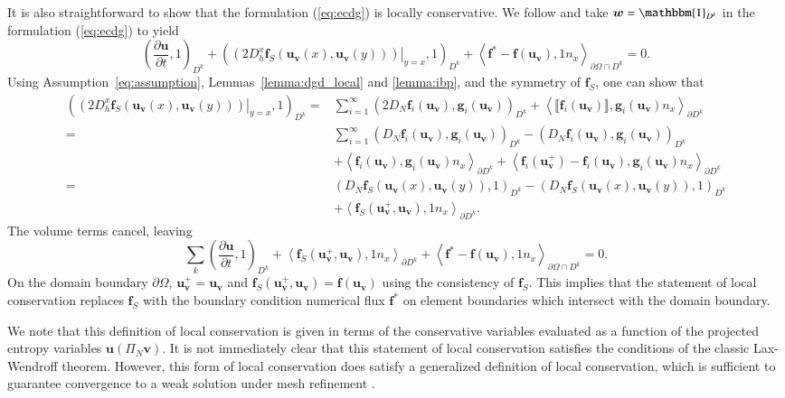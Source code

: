 \documentclass[preprint,10pt]{elsarticle}
\theoremstyle{definition}
\theoremstyle{lemma}
\theoremstyle{theorem}
\theoremstyle{assumption}
\newcommand{\pd}[2]{\frac{\partial#1}{\partial#2}}
\newcommand{\LRp}[1]{\left( #1 \right)}
\newcommand{\LRa}[1]{\left\langle #1 \right\rangle}
\newcommand{\jump}[1] {\ensuremath{\llbracket#1\rrbracket}}
\begin{document}
It is also straightforward to show that the formulation (\ref{eq:ecdg}) is locally conservative.  We follow \cite{chen2017entropy} and take $\bm{w} = \mathbbm{1}_{D^k}$ in the formulation (\ref{eq:ecdg}) to yield
\[
\LRp{\pd{\bm{u}}{t},1}_{D^k} + \LRp{\left.\LRp{2D^x_h\bm{f}_S(\bm{u}_{\bm{v}}(x),\bm{u}_{\bm{v}}(y))}\right|_{y=x},1}_{D^k} + \LRa{\bm{f}^*-\bm{f}(\bm{u}_{\bm{v}}),1{n}_x}_{\partial \Omega \cap D^k} = 0.  
\]
Using Assumption~\ref{eq:assumption}, Lemmas~\ref{lemma:dgd_local} and \ref{lemma:ibp}, and the symmetry of $\bm{f}_S$, one can show that
\begin{align*}
\LRp{\left.\LRp{2D^x_h\bm{f}_S(\bm{u}_{\bm{v}}(x),\bm{u}_{\bm{v}}(y))}\right|_{y=x},1}_{D^k} =& \sum_{i=1}^{\infty} \LRp{2D_N \bm{f}_i(\bm{u}_{\bm{v}}),\bm{g}_i(\bm{u}_{\bm{v}})}_{D^k} + \LRa{\jump{\bm{f}_i(\bm{u}_{\bm{v}})},\bm{g}_i(\bm{u}_{\bm{v}}){n}_x}_{\partial D^k}\\
=& \sum_{i=1}^{\infty} \LRp{D_N \bm{f}_i(\bm{u}_{\bm{v}}),\bm{g}_i(\bm{u}_{\bm{v}})}_{D^k} - \LRp{D_N \bm{f}_i(\bm{u}_{\bm{v}}),\bm{g}_i(\bm{u}_{\bm{v}})}_{D^k} \\
&+ \LRa{\bm{f}_i(\bm{u}_{\bm{v}}),\bm{g}_i(\bm{u}_{\bm{v}}){n}_x}_{\partial D^k} + \LRa{\bm{f}_i(\bm{u}_{\bm{v}}^+)-\bm{f}_i(\bm{u}_{\bm{v}}),\bm{g}_i(\bm{u}_{\bm{v}}){n}_x}_{\partial D^k}\\
=& \LRp{D_N \bm{f}_S(\bm{u}_{\bm{v}}(x),\bm{u}_{\bm{v}}(y)),1}_{D^k} -  \LRp{D_N \bm{f}_S(\bm{u}_{\bm{v}}(x),\bm{u}_{\bm{v}}(y)),1}_{D^k}\\
&+ \LRa{\bm{f}_S(\bm{u}_{\bm{v}}^+,\bm{u}_{\bm{v}}),1{n}_x}_{\partial D^k}.
\end{align*}
The volume terms cancel, leaving 
\[
\sum_{k}\LRp{\pd{\bm{u}}{t},1}_{D^k} + \LRa{\bm{f}_S(\bm{u}_{\bm{v}}^+,\bm{u}_{\bm{v}}),1{n}_x}_{\partial D^k} + \LRa{\bm{f}^* - \bm{f}(\bm{u}_{\bm{v}}),1{n}_x}_{\partial \Omega \cap D^k} = 0.  
\]
On the domain boundary $\partial \Omega$, $\bm{u}_{\bm{v}}^+ = \bm{u}_{\bm{v}}$ and $\bm{f}_S(\bm{u}_{\bm{v}}^+,\bm{u}_{\bm{v}}) = \bm{f}(\bm{u}_{\bm{v}})$ using the consistency of $\bm{f}_S$.  This implies that the statement of local conservation replaces $\bm{f}_S$ with the boundary condition numerical flux $\bm{f}^*$ on element boundaries which intersect with the domain boundary.  

We note that this definition of local conservation is given in terms of the conservative variables evaluated as a function of the projected entropy variables $\bm{u}\LRp{{\Pi_N \bm{v}}}$.  
It is not immediately clear that this statement of local conservation satisfies the conditions of the classic Lax-Wendroff theorem.  However, this form of local conservation does satisfy a generalized definition of local conservation, which is sufficient to guarantee convergence to a weak solution under mesh refinement \cite{shi2017local}.  
\end{document}

